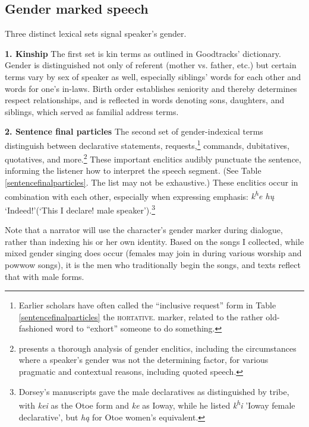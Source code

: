 \documentclass[output=paper]{LSP/langsci}
\begin{document}
\subsection{Gender marked speech} Three distinct lexical sets signal speaker's gender.  

\textbf{1.  Kinship}  The first set is kin terms as outlined in Goodtracks' dictionary. Gender is distinguished not only of referent (mother vs. father, etc.) but certain terms vary by sex of speaker as well, especially siblings' words for each other and words for one's in-laws.  Birth order establishes seniority and thereby determines respect relationships, and is reflected in words denoting sons, daughters, and siblings, which served as familial address terms.

\textbf{2. Sentence final particles} The second set of gender-indexical terms distinguish between declarative statements, requests,\footnote{Earlier scholars have often called the ``inclusive request'' form in Table \ref{sentencefinalparticles} the \textsc{hortative.} marker, related to the rather old-fashioned word to ``exhort'' someone to do something.}  commands, dubitatives, quotatives, and more.\footnote{\citet{Trechter1993} presents a thorough analysis of gender enclitics, including the circumstances where a speaker's gender was not the determining factor, for various pragmatic and contextual reasons, including quoted speech.} These important enclitics audibly punctuate the sentence, informing the listener how to interpret the speech segment.   (See Table \ref{sentencefinalparticles}. The list may not be exhaustive.) These enclitics occur in combination with each other, especially when expressing emphasis: \textit{k\textsuperscript{h}e h\k{u}} `Indeed!'(`This I declare! male speaker').\footnote{Dorsey's manuscripts gave the male declaratives as distinguished by tribe, with \textit{kei} as the Otoe form and \textit{ke} as Ioway, while he listed \textit{k\textsuperscript{h}i} 'Ioway female declarative', but \textit{h\k{a}} for Otoe women's equivalent.} 

Note that a narrator will use the character's gender marker during dialogue, rather than indexing his or her own identity. Based on the songs I collected, while mixed gender singing does occur (females may join in during various worship and powwow songs), it is the men who traditionally begin the songs, and texts reflect that with male forms.  
\end{document}

